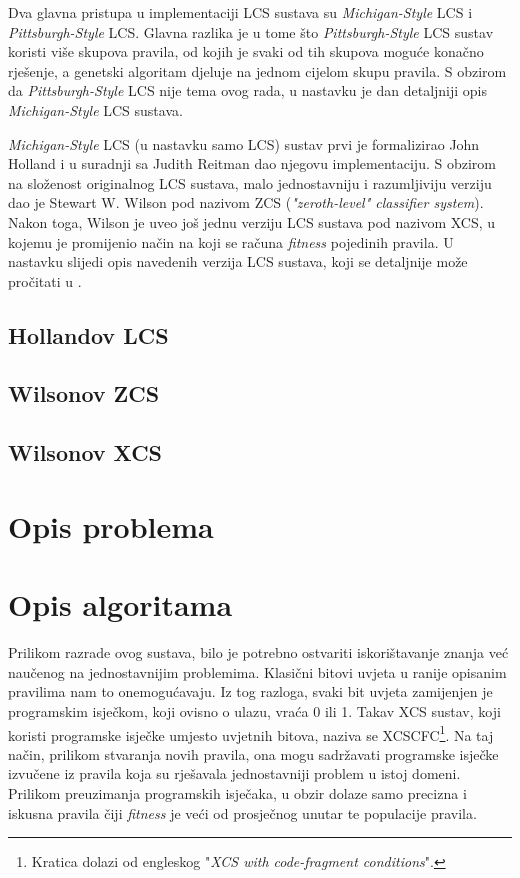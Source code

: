 \documentclass[times, utf8, zavrsni]{fer}
\begin{document}
Dva glavna pristupa u implementaciji LCS sustava su \emph{Michigan-Style} LCS i \emph{Pittsburgh-Style} LCS.
Glavna razlika je u tome što \emph{Pittsburgh-Style} LCS sustav koristi više skupova pravila, od kojih je svaki od tih skupova moguće konačno rješenje, a genetski algoritam djeluje na jednom cijelom skupu pravila. S obzirom da \emph{Pittsburgh-Style} LCS nije tema ovog rada, u nastavku je dan detaljniji opis \emph{Michigan-Style} LCS sustava.

\emph{Michigan-Style} LCS (u nastavku samo LCS) sustav prvi je formalizirao John Holland i u suradnji sa Judith Reitman dao njegovu implementaciju.
S obzirom na složenost originalnog LCS sustava, malo jednostavniju i razumljiviju verziju dao je Stewart W.
Wilson pod nazivom ZCS (\emph{"zeroth-level" classifier system}).
Nakon toga, Wilson je uveo još jednu verziju LCS sustava pod nazivom XCS, u kojemu je promijenio način na koji se računa \emph{fitness} pojedinih pravila. U nastavku slijedi opis navedenih verzija LCS sustava, koji se detaljnije može pročitati u \citep{3}.

\section{Hollandov LCS}


\section{Wilsonov ZCS}


\section{Wilsonov XCS}


\chapter{Opis problema}


\chapter{Opis algoritama} \label{algs}
Prilikom razrade ovog sustava, bilo je potrebno ostvariti iskorištavanje znanja već naučenog na jednostavnijim problemima.
Klasični bitovi uvjeta u ranije opisanim pravilima nam to onemogućavaju.
Iz tog razloga, svaki bit uvjeta zamijenjen je programskim isječkom, koji ovisno o ulazu, vraća 0 ili 1.
Takav XCS sustav, koji koristi programske isječke umjesto uvjetnih bitova, naziva se XCSCFC\footnote{Kratica dolazi od engleskog "\emph{XCS with code-fragment conditions}".}.
Na taj način, prilikom stvaranja novih pravila, ona mogu sadržavati programske isječke izvučene iz pravila koja su rješavala jednostavniji problem u istoj domeni.
Prilikom preuzimanja programskih isječaka, u obzir dolaze samo precizna i iskusna pravila čiji \emph{fitness} je veći od prosječnog unutar te populacije pravila. \citep{4}
\end{document}
